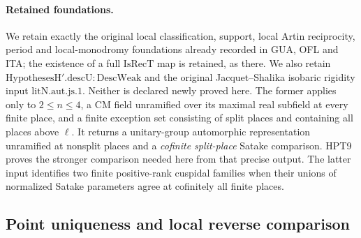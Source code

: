 \paragraph{Retained foundations.}
We retain exactly the original local classification, support,
local Artin reciprocity, period and local-monodromy foundations
already recorded in GUA, OFL and ITA; the existence of a full
$\mathrm{IsRecT}$ map is retained, as there.  We also retain
$\mathrm{HypothesesH}'.\mathrm{descU}:\mathrm{DescWeak}$ and the
original Jacquet--Shalika isobaric rigidity input
$\mathrm{litN.aut.js}.1$.  Neither is declared newly proved here.
The former applies only to $2\leq n\leq4$, a CM field unramified
over its maximal real subfield at every finite place, and a finite
exception set consisting of split places and containing all places
above $\ell$.  It returns a unitary-group automorphic representation
unramified at nonsplit places and a \emph{cofinite split-place}
Satake comparison.  HPT9 proves the stronger comparison needed here
from that precise output.  The latter input identifies two finite
positive-rank cuspidal families when their unions of normalized
Satake parameters agree at cofinitely all finite places.

\subsection{Point uniqueness and local reverse comparison}

